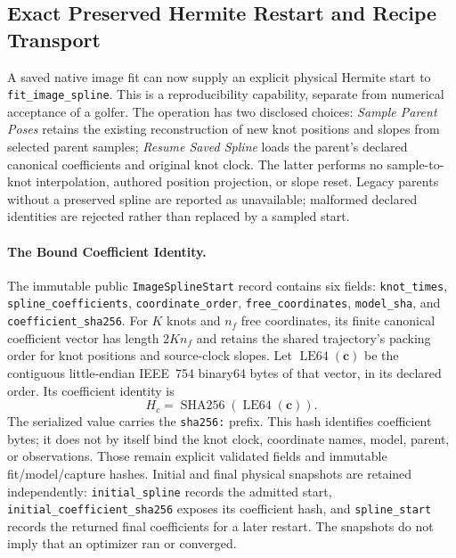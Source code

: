 \documentclass[11pt,letterpaper]{article}
\newcommand{\code}[1]{\nolinkurl{#1}}
\begin{document}
\subsection{Exact Preserved Hermite Restart and Recipe Transport}
\label{sec:preserved-restart}
A saved native image fit can now supply an explicit physical Hermite start to
\code{fit_image_spline}. This is a reproducibility capability, separate from
numerical acceptance of a golfer. The operation has two disclosed choices:
\emph{Sample Parent Poses} retains the existing reconstruction of new knot
positions and slopes from selected parent samples; \emph{Resume Saved Spline}
loads the parent's declared canonical coefficients and original knot clock.
The latter performs no sample-to-knot interpolation, authored position
projection, or slope reset. Legacy parents without a preserved spline are
reported as unavailable; malformed declared identities are rejected rather
than replaced by a sampled start.

\paragraph{The Bound Coefficient Identity.}
The immutable public \code{ImageSplineStart} record contains six fields:
\code{knot_times}, \code{spline_coefficients}, \code{coordinate_order},
\code{free_coordinates}, \code{model_sha}, and \code{coefficient_sha256}.
For $K$ knots and $n_f$ free coordinates, its finite canonical coefficient
vector has length $2K n_f$ and retains the shared trajectory's packing order
for knot positions and source-clock slopes. Let $\operatorname{LE64}(\mathbf c)$
be the contiguous little-endian IEEE~754 binary64 bytes of that vector, in
its declared order. Its coefficient identity is
\begin{equation}
 H_c=\operatorname{SHA256}\!\left(\operatorname{LE64}(\mathbf c)\right).
\end{equation}
The serialized value carries the \code{sha256:} prefix. This hash identifies
coefficient bytes; it does not by itself bind the knot clock, coordinate
names, model, parent, or observations. Those remain explicit validated fields
and immutable fit/model/capture hashes. Initial and final physical snapshots
are retained independently: \code{initial_spline} records the admitted start,
\code{initial_coefficient_sha256} exposes its coefficient hash, and
\code{spline_start} records the returned final coefficients for a later
restart. The snapshots do not imply that an optimizer ran or converged.
\end{document}
